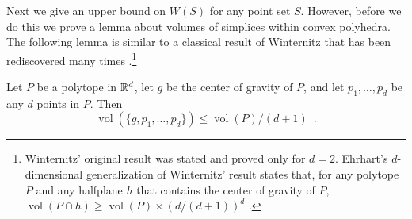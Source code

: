 \documentclass[lotsofwhite]{patmorin}
\DeclareMathOperator{\vol}{vol}
\begin{document}
Next we give an upper bound on $W(S)$ for any point set $S$.  However,
before we do this we prove a lemma about volumes of simplices within
convex polyhedra. The following lemma is similar to a classical result
of Winternitz \cite{X} that has been rediscovered many times
\cite{X}.\footnote{Winternitz' original result was stated and proved
only for $d=2$.  Ehrhart's $d$-dimensional generalization of
Winternitz' result states that, for any polytope $P$ and any
halfplane $h$ that contains the center of gravity of $P$, $\vol(P\cap
h) \ge \vol(P)\times (d/(d+1))^d$ \cite{eXX}.}

\begin{lem}
Let $P$ be a polytope in $\mathbb{R}^d$, let $g$ be the center of
gravity of $P$, and let $p_1,\ldots,p_d$ be any $d$ points in $P$. Then
\[
   \vol(\{g,p_1,\ldots,p_d\}) \le \vol(P) / (d+1) \enspace .
\] 
\end{lem}
\end{document}
